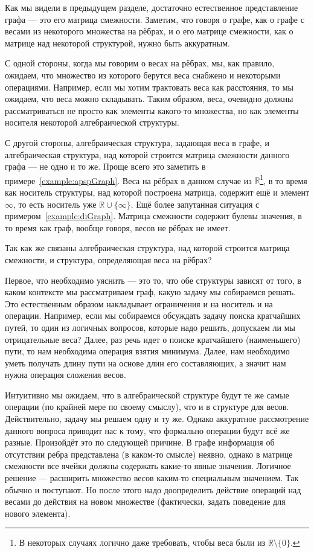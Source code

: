 Как мы видели в предыдущем разделе, достаточно естественное представление графа --- это его матрица смежности. Заметим, что говоря о графе, как о графе с весами из некоторого множества на рёбрах, и о его матрице смежности, как о матрице над некоторой структурой, нужно быть аккуратным.

С одной стороны, когда мы говорим о весах на рёбрах, мы, как правило, ожидаем, что множество из которого берутся веса снабжено и некоторыми операциями. Например, если мы хотим трактовать веса как расстояния, то мы ожидаем, что веса можно складывать. Таким образом, веса, очевидно должны рассматриваться не просто как элементы какого-то множества, но как элементы носителя некоторой алгебраической структуры. 

С другой стороны, алгебраическая структура, задающая веса в графе, и алгебраическая структура, над которой строится матрица смежности данного графа --- не одно и то же. Проще всего это заметить в примере~\ref{example:apspGraph}. Веса на рёбрах в данном случае из $\mathbb{R}$\footnote{В некоторых случаях логично даже требовать, чтобы веса были из $\mathbb{R} \setminus \{0\}$.}, в то время как носитель структуры, над которой построена матрица, содержит ещё и элемент $\infty$, то есть носитель уже $\mathbb{R}\cup\{\infty\}$. Ещё более запутанная ситуация с примером~\ref{example:diGraph}. Матрица смежности содержит булевы значения, в то время как граф, вообще говоря, весов не рёбрах не имеет.

Так как же связаны алгебраическая структура, над которой строится матрица смежности, и структура, определяющая веса на рёбрах? 

Первое, что необходимо уяснить --- это то, что обе структуры зависят от того, в каком контексте мы рассматриваем граф, какую задачу мы собираемся решать. Это естественным образом накладывает ограничения и на носитель и на операции. Например, если мы собираемся обсуждать задачу поиска кратчайших путей, то один из логичных вопросов, которые надо решить, допускаем ли мы отрицательные веса? Далее, раз речь идет о поиске кратчайшего (наименьшего) пути, то нам необходима операция взятия минимума. Далее, нам необходимо уметь получать длину пути на основе длин его составляющих, а значит нам нужна операция сложения весов.

Интуитивно мы ожидаем, что в алгебраической структуре будут те же самые операции (по крайней мере по своему смыслу), что и в структуре для весов. Действительно, задачу мы решаем одну и ту же. Однако аккуратное рассмотрение данного вопроса приводит нас к тому, что формально операции будут всё же разные. Произойдёт это по следующей причине. В графе информация об отсутствии ребра представлена (в каком-то смысле) неявно, однако в матрице смежности все ячейки должны содержать какие-то явные значения. Логичное решение --- расширить множество весов каким-то специальным значением. Так обычно и поступают. Но после этого надо доопределить действие операций над весами до действия на новом множестве (фактически, задать поведение для нового элемента).

